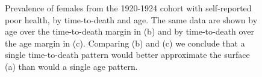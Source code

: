\documentclass[12pt,oneside,a4paper]{article} %
\begin{document}
\begin{figure}[ht!]
    \caption{Prevalence of females from the 1920-1924 cohort with self-reported poor health, by time-to-death and age. The same data are shown by age over the time-to-death margin in (b) and by time-to-death over the age margin in (c). Comparing (b) and (c) we conclude that a single time-to-death pattern would better approximate the surface (a) than would a single age pattern.}\label{fig:srhpoortal}
\end{figure}
 
\end{document}
